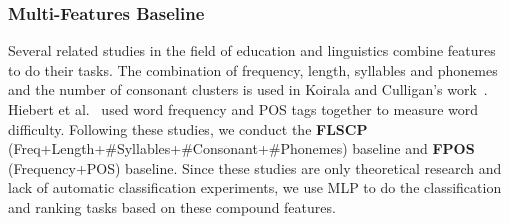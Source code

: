 


\subsubsection{Multi-Features Baseline}
Several related studies in the field of education and linguistics combine features to do their tasks. 
The combination of frequency, length, syllables and phonemes and the number of consonant clusters is used in Koirala and Culligan's work~. 
Hiebert et al.~ used word frequency and POS tags together to measure word difficulty.
Following these studies, we conduct the \textbf{FLSCP} (Freq+Length+\#Syllables+\#Consonant+\#Phonemes) baseline and \textbf{FPOS} (Frequency+POS) baseline.
Since these studies are only theoretical research and lack of automatic classification experiments, 
we use MLP to do the classification and ranking tasks based on these compound features.

